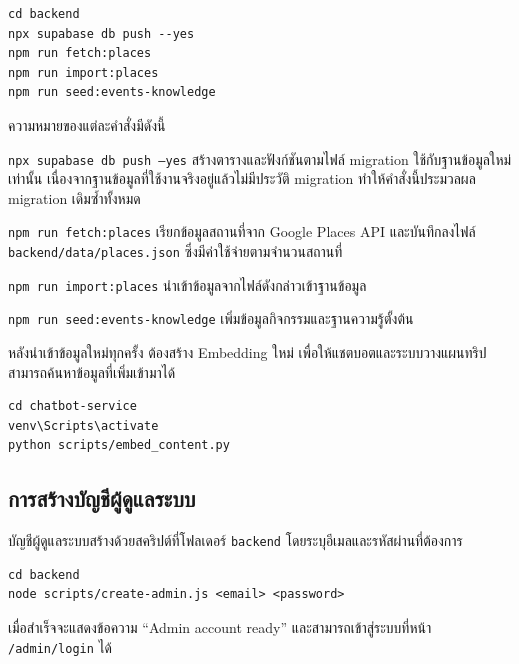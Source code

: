 \begin{codeblock}
\begin{lstlisting}[numbers=none]
cd backend
npx supabase db push --yes
npm run fetch:places
npm run import:places
npm run seed:events-knowledge
\end{lstlisting}
\end{codeblock}

ความหมายของแต่ละคำสั่งมีดังนี้

\begin{numlist}
\item \texttt{npx supabase db push --yes} สร้างตารางและฟังก์ชันตามไฟล์ migration ใช้กับฐานข้อมูลใหม่เท่านั้น เนื่องจากฐานข้อมูลที่ใช้งานจริงอยู่แล้วไม่มีประวัติ migration ทำให้คำสั่งนี้ประมวลผล migration เดิมซ้ำทั้งหมด
\item \texttt{npm run fetch:places} เรียกข้อมูลสถานที่จาก Google Places API และบันทึกลงไฟล์ \texttt{backend/data/places.json} ซึ่งมีค่าใช้จ่ายตามจำนวนสถานที่
\item \texttt{npm run import:places} นำเข้าข้อมูลจากไฟล์ดังกล่าวเข้าฐานข้อมูล
\item \texttt{npm run seed:events-knowledge} เพิ่มข้อมูลกิจกรรมและฐานความรู้ตั้งต้น
\end{numlist}

หลังนำเข้าข้อมูลใหม่ทุกครั้ง ต้องสร้าง Embedding ใหม่ เพื่อให้แชตบอตและระบบวางแผนทริปสามารถค้นหาข้อมูลที่เพิ่มเข้ามาได้

\begin{codeblock}
\begin{lstlisting}[numbers=none]
cd chatbot-service
venv\Scripts\activate
python scripts/embed_content.py
\end{lstlisting}
\end{codeblock}

\subsection{การสร้างบัญชีผู้ดูแลระบบ}
\label{sec:create-admin}

บัญชีผู้ดูแลระบบสร้างด้วยสคริปต์ที่โฟลเดอร์ \texttt{backend} โดยระบุอีเมลและรหัสผ่านที่ต้องการ

\begin{codeblock}
\begin{lstlisting}[numbers=none]
cd backend
node scripts/create-admin.js <email> <password>
\end{lstlisting}
\end{codeblock}

เมื่อสำเร็จจะแสดงข้อความ ``Admin account ready'' และสามารถเข้าสู่ระบบที่หน้า \texttt{/admin/login} ได้

